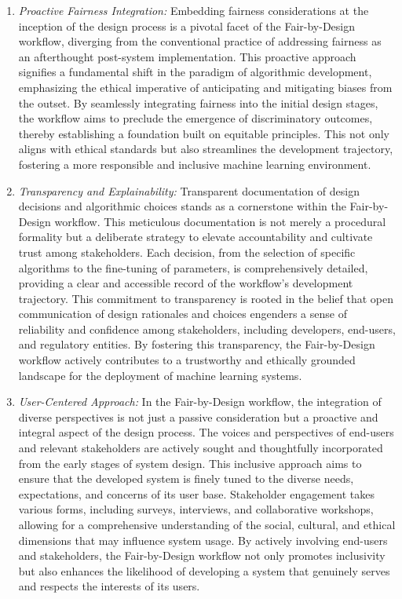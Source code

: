 \documentclass[12pt,a4paper,openright,twoside]{book}
\begin{document}
\begin{enumerate}

    \item \emph{Proactive Fairness Integration:} Embedding fairness considerations at the inception of the design process is a pivotal facet of the Fair-by-Design workflow, diverging from the conventional practice of addressing fairness as an afterthought post-system implementation. This proactive approach signifies a fundamental shift in the paradigm of algorithmic development, emphasizing the ethical imperative of anticipating and mitigating biases from the outset. By seamlessly integrating fairness into the initial design stages, the workflow aims to preclude the emergence of discriminatory outcomes, thereby establishing a foundation built on equitable principles. This not only aligns with ethical standards but also streamlines the development trajectory, fostering a more responsible and inclusive machine learning environment.

    \item \emph{Transparency and Explainability:} Transparent documentation of design decisions and algorithmic choices stands as a cornerstone within the Fair-by-Design workflow. This meticulous documentation is not merely a procedural formality but a deliberate strategy to elevate accountability and cultivate trust among stakeholders. Each decision, from the selection of specific algorithms to the fine-tuning of parameters, is comprehensively detailed, providing a clear and accessible record of the workflow's development trajectory. This commitment to transparency is rooted in the belief that open communication of design rationales and choices engenders a sense of reliability and confidence among stakeholders, including developers, end-users, and regulatory entities. By fostering this transparency, the Fair-by-Design workflow actively contributes to a trustworthy and ethically grounded landscape for the deployment of machine learning systems.

    \item \emph{User-Centered Approach:} In the Fair-by-Design workflow, the integration of diverse perspectives is not just a passive consideration but a proactive and integral aspect of the design process. The voices and perspectives of end-users and relevant stakeholders are actively sought and thoughtfully incorporated from the early stages of system design. This inclusive approach aims to ensure that the developed system is finely tuned to the diverse needs, expectations, and concerns of its user base. Stakeholder engagement takes various forms, including surveys, interviews, and collaborative workshops, allowing for a comprehensive understanding of the social, cultural, and ethical dimensions that may influence system usage. By actively involving end-users and stakeholders, the Fair-by-Design workflow not only promotes inclusivity but also enhances the likelihood of developing a system that genuinely serves and respects the interests of its users.


\end{enumerate}
\end{document}
